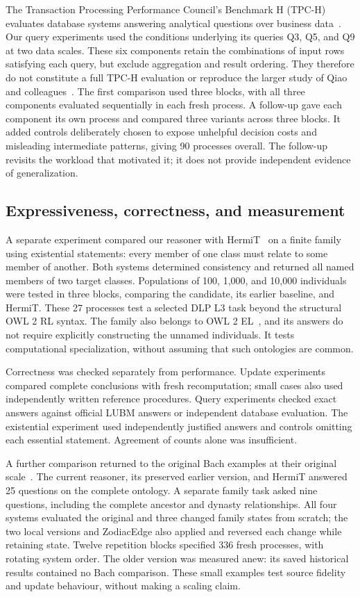 The Transaction Processing Performance Council's Benchmark H (TPC-H) evaluates
database systems answering analytical questions over business data~\cite{tpch}.
Our query experiments used the conditions underlying its queries Q3, Q5,
and Q9 at two data scales. These six components retain the combinations of
input rows satisfying each query, but exclude aggregation and result ordering.
They therefore do not constitute a full TPC-H evaluation or reproduce the
larger study of Qiao and colleagues~\cite{qiao2026}. The first comparison used
three blocks, with all three components evaluated sequentially in each fresh
process. A follow-up gave each component its own process and compared three
variants across three blocks. It added controls deliberately chosen to expose
unhelpful decision costs and misleading intermediate patterns, giving 90
processes overall. The follow-up revisits the workload that motivated it;
it does not provide independent evidence of generalization.

\subsection{Expressiveness, correctness, and measurement}
A separate experiment compared our reasoner with HermiT~\cite{glimm2014hermit}
on a finite family using existential statements: every member of one class
must relate to some member of another. Both systems determined consistency
and returned all named members of two target classes. Populations of 100,
1,000, and 10,000 individuals were tested in three blocks, comparing the
candidate, its earlier baseline, and HermiT. These 27 processes test a selected
DLP L3 task beyond the structural OWL 2 RL syntax. The family also belongs to
OWL 2 EL~\cite{owlprofiles2012}, and its answers do not require explicitly
constructing the unnamed individuals. It tests computational specialization,
without assuming that such ontologies are common.

Correctness was checked separately from performance. Update experiments
compared complete conclusions with fresh recomputation; small cases also used
independently written reference procedures. Query experiments checked exact
answers against official LUBM answers or independent database evaluation.
The existential experiment used independently justified answers and controls
omitting each essential statement. Agreement of counts alone was insufficient.

A further comparison returned to the original Bach examples at their original
scale~\cite[Table~2.5, p.~35; Figure~6.2, p.~150]{volz2004}. The current
reasoner, its preserved earlier version, and HermiT answered 25 questions on
the complete ontology. A separate family task asked nine questions, including
the complete ancestor and dynasty relationships. All four systems evaluated
the original and three changed family states from scratch; the two local
versions and ZodiacEdge also applied and reversed each change while retaining
state. Twelve repetition blocks specified 336 fresh processes, with rotating
system order. The older version was measured anew: its saved historical
results contained no Bach comparison. These small examples test source fidelity
and update behaviour, without making a scaling claim.

